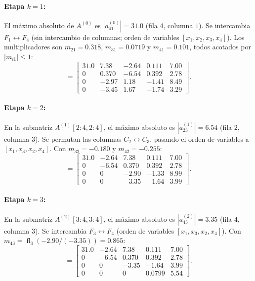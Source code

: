 \documentclass[11pt,letterpaper]{article}
\begin{document}
\paragraph{Etapa $k = 1$:}
El máximo absoluto de $A^{(0)}$ es $|a_{41}^{(0)}| = 31.0$ (fila $4$, columna $1$). Se intercambia $F_1 \leftrightarrow F_4$ (sin intercambio de columnas; orden de variables $[x_1, x_2, x_3, x_4]$). Los multiplicadores son $m_{21} = 0.318$, $m_{31} = 0.0719$ y $m_{41} = 0.101$, todos acotados por $|m_{i1}| \le 1$:
\begin{equation*}
    [A^{(1)} \mid b^{(1)}] =
    \left[
    \begin{array}{cccc|c}
        31.0 &  7.38 & -2.64 &  0.111 & 7.00 \\
        0    & 0.370 & -6.54 &  0.392 & 2.78 \\
        0    & -2.97 &  1.18 &  -1.41 & 8.49 \\
        0    & -3.45 &  1.67 &  -1.74 & 3.29
    \end{array}
    \right].
\end{equation*}

\paragraph{Etapa $k = 2$:}
En la submatriz $A^{(1)}[2:4, 2:4]$, el máximo absoluto es $|a_{23}^{(1)}| = 6.54$ (fila $2$, columna $3$). Se permutan las columnas $C_2 \leftrightarrow C_3$, pasando el orden de variables a $[x_1, x_3, x_2, x_4]$. Con $m_{32} = -0.180$ y $m_{42} = -0.255$:
\begin{equation*}
    [A^{(2)} \mid b^{(2)}] =
    \left[
    \begin{array}{cccc|c}
        31.0 & -2.64 &  7.38 & 0.111 & 7.00 \\
        0    & -6.54 & 0.370 & 0.392 & 2.78 \\
        0    &  0    & -2.90 & -1.33 & 8.99 \\
        0    &  0    & -3.35 & -1.64 & 3.99
    \end{array}
    \right].
\end{equation*}

\paragraph{Etapa $k = 3$:}
En la submatriz $A^{(2)}[3:4, 3:4]$, el máximo absoluto es $|a_{43}^{(2)}| = 3.35$ (fila $4$, columna $3$). Se intercambia $F_3 \leftrightarrow F_4$ (orden de variables $[x_1, x_3, x_2, x_4]$). Con $m_{43} = \operatorname{fl}_3(-2.90 / (-3.35)) = 0.865$:
\begin{equation*}
    [A^{(3)} \mid b^{(3)}] =
    \left[
    \begin{array}{cccc|c}
        31.0 & -2.64 &  7.38 &  0.111 & 7.00 \\
        0    & -6.54 & 0.370 &  0.392 & 2.78 \\
        0    &  0    & -3.35 &  -1.64 & 3.99 \\
        0    &  0    &  0    & 0.0799 & 5.54
    \end{array}
    \right].
\end{equation*}
\end{document}
